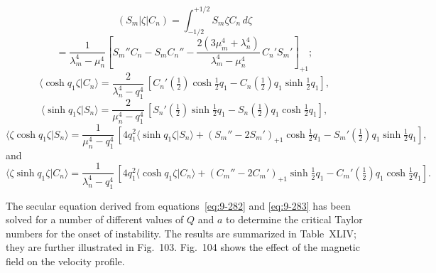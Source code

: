 \begin{equation}
(S_m|\zeta|C_n) = \int_{-1/2}^{+1/2} S_m\zeta C_n\, d\zeta \label{eq:9-288}
\end{equation}
\[
= \frac{1}{\lambda_m^4 - \mu_n^4}\left[S_m'' C_n - S_m C_n'' - \frac{2(3\mu_m^4 + \lambda_n^4)}{\lambda_m^4 - \mu_n^4}\, C_n' S_m'\right]_{+1};
\]
\begin{equation}
\langle\cosh q_1\zeta|C_n\rangle = \frac{2}{\lambda_n^4 - q_1^4}\,[C_n'(\tfrac{1}{2})\cosh\tfrac{1}{2}q_1 - C_n(\tfrac{1}{2})q_1\sinh\tfrac{1}{2}q_1], \label{eq:9-289}
\end{equation}
\begin{equation}
\langle\sinh q_1\zeta|S_n\rangle = \frac{2}{\mu_n^4 - q_1^4}\,[S_n'(\tfrac{1}{2})\sinh\tfrac{1}{2}q_1 - S_n(\tfrac{1}{2})q_1\cosh\tfrac{1}{2}q_1], \label{eq:9-290}
\end{equation}
\begin{equation}
\langle\zeta\cosh q_1\zeta|S_n\rangle = \frac{1}{\mu_n^4 - q_1^4}\,[4q_1^2\langle\sinh q_1\zeta|S_n\rangle + (S_m'' - 2S_m')_{+1}\cosh\tfrac{1}{2}q_1 - S_m'(\tfrac{1}{2})q_1\sinh\tfrac{1}{2}q_1], \label{eq:9-291}
\end{equation}
and
\begin{equation}
\langle\zeta\sinh q_1\zeta|C_n\rangle = \frac{1}{\lambda_n^4 - q_1^4}\,[4q_1^2\langle\cosh q_1\zeta|C_n\rangle + (C_m'' - 2C_m')_{+1}\sinh\tfrac{1}{2}q_1 - C_m'(\tfrac{1}{2})q_1\cosh\tfrac{1}{2}q_1]. \label{eq:9-292}
\end{equation}

The secular equation derived from equations~\eqref{eq:9-282} and \eqref{eq:9-283} has been solved for a number of different values of $Q$ and $a$ to determine the critical Taylor numbers for the onset of instability. The results are summarized in Table~XLIV; they are further illustrated in Fig.~103. Fig.~104 shows the effect of the magnetic field on the velocity profile.

